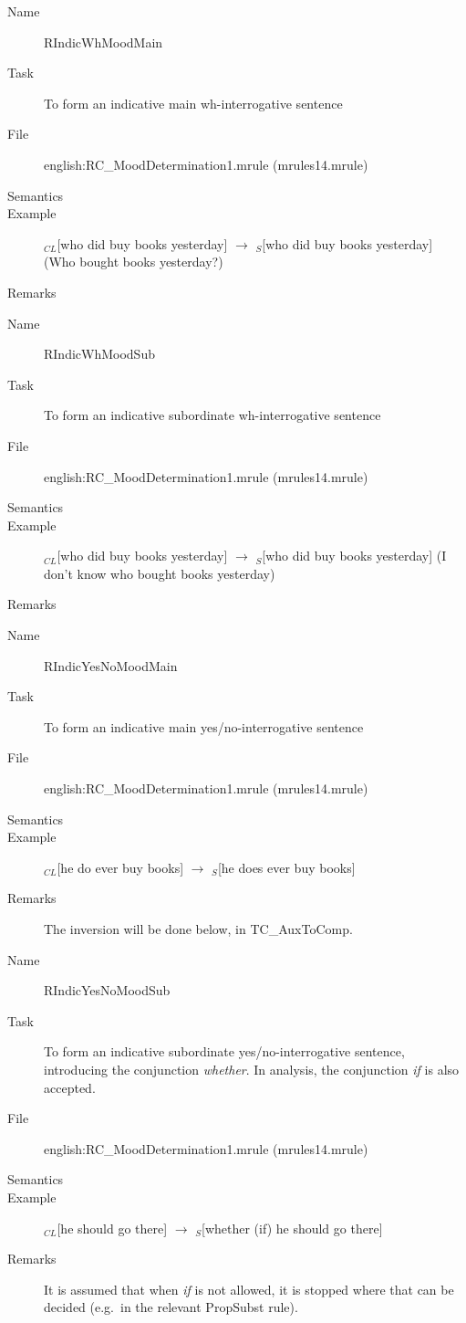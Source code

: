 \begin{description}
\vspace{1 cm}
\begin{description}
\item[Name] RIndicWhMoodMain
\item[Task] To form an indicative main wh-interrogative sentence
\item[File] english:RC\_MoodDetermination1.mrule (mrules14.mrule)
\item[Semantics]
\item[Example] $_{CL}$[who did buy books yesterday] $\rightarrow$ $_S$[who did 
buy books yesterday] (Who bought books yesterday?)
\item[Remarks]
\end{description}

\vspace{1 cm}
\begin{description}
\item[Name] RIndicWhMoodSub
\item[Task] To form an indicative subordinate wh-interrogative  sentence
\item[File] english:RC\_MoodDetermination1.mrule (mrules14.mrule)
\item[Semantics]
\item[Example] $_{CL}$[who did buy books yesterday] $\rightarrow$ $_S$[who did 
buy books yesterday] (I don't know who bought books yesterday)
\item[Remarks]
\end{description}

\vspace{1 cm}
\begin{description}
\item[Name] RIndicYesNoMoodMain
\item[Task] To form an indicative main yes/no-interrogative  sentence
\item[File] english:RC\_MoodDetermination1.mrule (mrules14.mrule)
\item[Semantics]
\item[Example] $_{CL}$[he do ever buy books] $\rightarrow$ $_S$[he does ever 
buy books]
\item[Remarks] The inversion will be done below, in TC\_AuxToComp.
\end{description}

\vspace{1 cm}
\begin{description}
\item[Name] RIndicYesNoMoodSub
\item[Task] To form an indicative subordinate yes/no-interrogative  sentence, 
introducing the conjunction {\em whether\/}. In analysis, the conjunction {\em 
if\/} is also accepted.
\item[File] english:RC\_MoodDetermination1.mrule (mrules14.mrule)
\item[Semantics]
\item[Example] $_{CL}$[he should go there] $\rightarrow$ $_S$[whether (if) he 
should go there]
\item[Remarks] It is assumed that when {\em if\/} is not allowed, it is 
stopped where that can be decided (e.g.\ in the relevant PropSubst rule).
\end{description}


\end{description}
